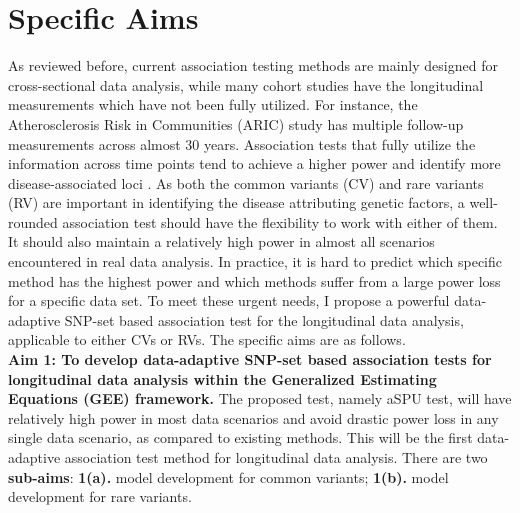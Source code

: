 \documentclass[12pt]{article}
\begin{document}
\section{Specific Aims}\label{sec:aims}
As reviewed before, current association testing methods are mainly designed for cross-sectional data analysis, while many cohort studies have the longitudinal measurements which have not been fully utilized. For instance, the Atherosclerosis Risk in Communities (ARIC) study \cite{Heiss1989} has multiple follow-up measurements across almost 30 years. Association tests that fully utilize the information across time points tend to achieve a higher power and identify more disease-associated loci \cite{Furlotte2012,Xu2014}. As both the common variants (CV) and rare variants (RV) are important in identifying the disease attributing genetic factors, a well-rounded association test should have the flexibility to work with either of them. It should also maintain a relatively high power in almost all scenarios encountered in real data analysis. In practice, it is hard to predict which specific method has the highest power and which methods suffer from a large power loss for a specific data set. To meet these urgent needs, I propose a powerful data-adaptive SNP-set based association test for the longitudinal data analysis, applicable to either CVs or RVs. The specific aims are as follows.\\
\textbf{Aim 1: To develop data-adaptive SNP-set based association tests for longitudinal data analysis within the Generalized Estimating Equations (GEE) framework.}
The proposed test, namely aSPU test, will have relatively high power in most data scenarios and avoid drastic power loss in any single data scenario, as compared to existing methods. This will be the first data-adaptive association test method for longitudinal data analysis. There are two \textbf{sub-aims}: \textbf{1(a).} model development for common variants; \textbf{1(b).} model development for rare variants. %
\end{document}
